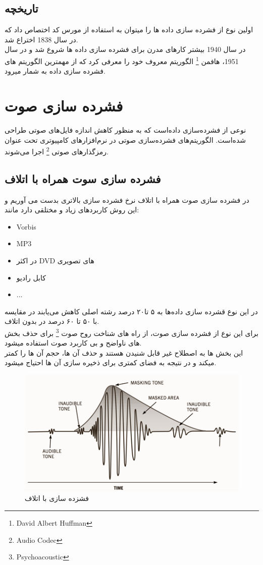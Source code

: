\subsection{تاریخچه}
اولین نوع از فشرده سازی داده ها را میتوان به استفاده از مورس کد اختصاص داد که در سال 
1838 
اختراع شد. 
\\
در سال 1940 بیشتر کارهای مدرن برای فشرده سازی داده ها شروع شد و 
در سال 1951، هافمن 
\footnote{David Albert Huffman} 
الگوریتم معروف خود را معرفی کرد که از مهمترین الگوریتم های فشرده سازی داده به شمار میرود.


\section{فشرده سازی صوت}
نوعی از فشرده‌سازی داده‌است که به منظور کاهش اندازه فایل‌های صوتی طراحی شده‌است. الگوریتم‌های فشرده‌سازی صوتی در نرم‌افزارهای کامپیوتری تحت عنوان رمزگذارهای صوتی
\footnote{Audio Codec}
اجرا می‌شوند.
\subsection{فشرده سازی سوت همراه با اتلاف}
در فشرده سازی صوت همراه با اتلاف نرخ فشرده سازی بالاتری بدست می آوریم و این روش
کاربردهای زیاد و مختلقی دارد مانند:

\begin{itemize}
    \item    
    Vorbis
    \item
    MP3
    \item
    در اکثر DVD های تصویری
    \item
    کابل رادیو
    \item
    ...
\end{itemize}
در این نوع قشرده سازی داده‌ها به ۵ تا۲۰ درصد رشته اصلی کاهش می‌یابند در مقایسه با ۵۰ تا ۶۰ درصد در بدون اتلاف.
\\
برای این نوع از فشرده سازی صوت، از راه های شناخت روح صوت
\footnote{Psychoacoustic}
برای حذف بخش های ناواضح و بی کاربرد صوت استفاده میشود. 
\\
این بخش ها به اصطلاح غیر قابل شنیدن هستند و حذف آن ها، حجم آن ها را کمتر میکند و در نتیجه به فضای کمتری برای ذخیره سازی آن ها احتیاج میشود.
\begin{figure}[H]
    \centering
    \includegraphics[width=0.5\linewidth]{images/lossy1.png}
    \caption{فشزده سازی با اتلاف}
    \label{fig:mesal1}
\end{figure}

